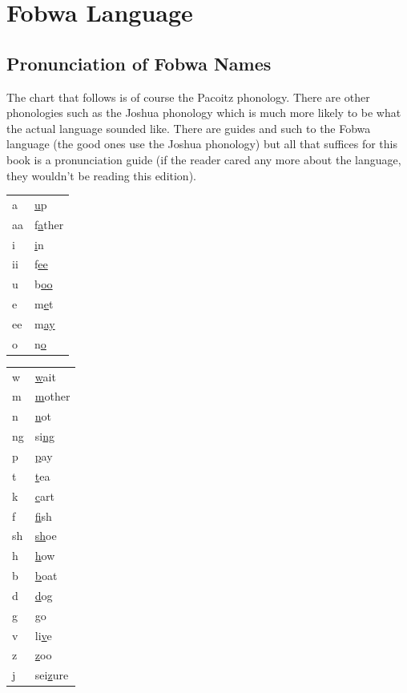 \chapter{Fo\-bwa Language}
\section{Pronunciation of Fobwa Names}
The chart that follows is of course the Pa\-co\-itz phonology. There are other phonologies such as the Joshua phonology which is much more likely to be what the actual language sounded like. There are guides and such to the Fobwa language (the good ones use the Joshua phonology) but all that suffices for this book is a pronunciation guide (if the reader cared any more about the language, they wouldn't be reading this edition).\\
\begin{tabular}
{| l  l |}
\hline
a & \underline{u}p \\
aa & f\underline{a}ther \\
i & \underline{i}n \\
ii & f\underline{ee} \\
u & b\underline{oo} \\
e & m\underline{e}t \\
ee & m\underline{ay} \\
o & n\underline{o} \\
\hline
\end{tabular}
\begin{tabular}
{| l   l |}
\hline
w & \underline{w}ait \\
m & \underline{m}other \\
n & \underline{n}ot \\
ng & si\underline{ng} \\
p & \underline{p}ay \\
t & \underline{t}ea \\
k & \underline{c}art \\
f & \underline{f}ish \\
sh & \underline{sh}oe \\
h & \underline{h}ow \\
b & \underline{b}oat \\
d & \underline{d}og \\
g & \underline{g}o \\
v & li\underline{v}e \\
z & \underline{z}oo \\
j & sei\underline{z}ure \\
\hline
\end{tabular}
